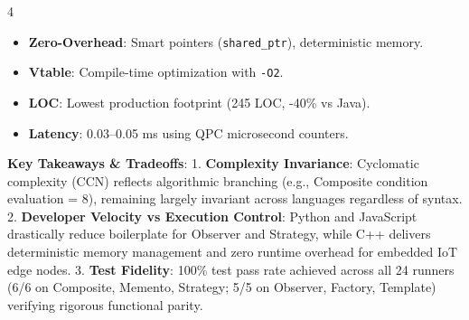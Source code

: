 \documentclass[landscape,10pt,a4paper]{article}
\begin{document}
\begin{multicols}{4}
\begin{tcolorbox}[title=\textbf{C++ (Native / RAII)},colback=white,colframe=headerblue!80,arc=2mm,boxrule=0.5pt,top=1mm,bottom=1mm,left=1.5mm,right=1.5mm]
\scriptsize
\begin{itemize}[leftmargin=*,noitemsep]
\item \textbf{Zero-Overhead}: Smart pointers (\texttt{shared\_ptr}), deterministic memory.
\item \textbf{Vtable}: Compile-time optimization with \texttt{-O2}.
\item \textbf{LOC}: Lowest production footprint (245 LOC, -40\% vs Java).
\item \textbf{Latency}: 0.03--0.05 ms using QPC microsecond counters.
\end{itemize}
\end{tcolorbox}

\end{multicols}

\vspace{-3mm}

\begin{tcolorbox}[colback=accentgray,colframe=gray!50,arc=2mm,boxrule=0.5pt,top=1mm,bottom=1mm]
\scriptsize
\textbf{Key Takeaways \& Tradeoffs}:
1. \textbf{Complexity Invariance}: Cyclomatic complexity (CCN) reflects algorithmic branching (e.g., Composite condition evaluation = 8), remaining largely invariant across languages regardless of syntax.
2. \textbf{Developer Velocity vs Execution Control}: Python and JavaScript drastically reduce boilerplate for Observer and Strategy, while C++ delivers deterministic memory management and zero runtime overhead for embedded IoT edge nodes.
3. \textbf{Test Fidelity}: 100\% test pass rate achieved across all 24 runners (6/6 on Composite, Memento, Strategy; 5/5 on Observer, Factory, Template) verifying rigorous functional parity.
\end{tcolorbox}
\end{document}
